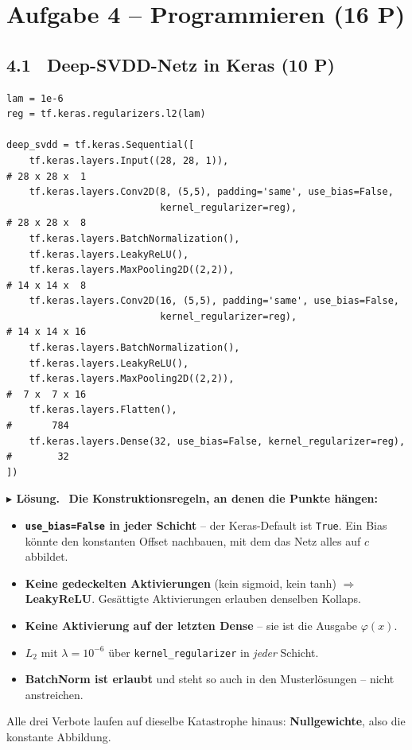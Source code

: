 \documentclass[10pt,a4paper]{article}
\newcommand{\pkt}[1]{\hfill\textbf{(#1 P)}}
\newenvironment{loes}%
  {\par\vspace{2pt}\begingroup\small\noindent\textbf{\color{loesfarbe}$\blacktriangleright$ Lösung.}\ }%
  {\endgroup\par\vspace{5pt}}
\begin{document}
\newpage
\section*{Aufgabe 4 -- Programmieren \pkt{16}}

\subsection*{4.1 \ Deep-SVDD-Netz in Keras \pkt{10}}

\begin{lstlisting}
lam = 1e-6
reg = tf.keras.regularizers.l2(lam)

deep_svdd = tf.keras.Sequential([
    tf.keras.layers.Input((28, 28, 1)),                                       # 28 x 28 x  1
    tf.keras.layers.Conv2D(8, (5,5), padding='same', use_bias=False,
                           kernel_regularizer=reg),                           # 28 x 28 x  8
    tf.keras.layers.BatchNormalization(),
    tf.keras.layers.LeakyReLU(),
    tf.keras.layers.MaxPooling2D((2,2)),                                      # 14 x 14 x  8
    tf.keras.layers.Conv2D(16, (5,5), padding='same', use_bias=False,
                           kernel_regularizer=reg),                           # 14 x 14 x 16
    tf.keras.layers.BatchNormalization(),
    tf.keras.layers.LeakyReLU(),
    tf.keras.layers.MaxPooling2D((2,2)),                                      #  7 x  7 x 16
    tf.keras.layers.Flatten(),                                                #       784
    tf.keras.layers.Dense(32, use_bias=False, kernel_regularizer=reg),        #        32
])
\end{lstlisting}

\begin{loes}
\textbf{Die Konstruktionsregeln, an denen die Punkte hängen:}
\begin{itemize}
\item \textbf{\texttt{use\_bias=False} in jeder Schicht} -- der Keras-Default ist \texttt{True}.
  Ein Bias könnte den konstanten Offset nachbauen, mit dem das Netz alles auf $c$ abbildet.
\item \textbf{Keine gedeckelten Aktivierungen} (kein sigmoid, kein tanh) $\Rightarrow$
  \textbf{LeakyReLU}. Gesättigte Aktivierungen erlauben denselben Kollaps.
\item \textbf{Keine Aktivierung auf der letzten Dense} -- sie ist die Ausgabe $\varphi(x)$.
\item $L_2$ mit $\lambda = 10^{-6}$ über \texttt{kernel\_regularizer} in \emph{jeder} Schicht.
\item \textbf{BatchNorm ist erlaubt} und steht so auch in den Musterlösungen -- nicht anstreichen.
\end{itemize}
Alle drei Verbote laufen auf dieselbe Katastrophe hinaus: \textbf{Nullgewichte}, also die konstante
Abbildung.
\end{loes}
\end{document}
